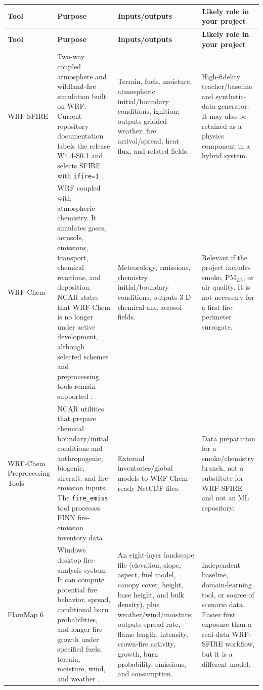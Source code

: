 \documentclass[11pt]{article}
\begin{document}
\begin{longtable}{p{}p{}p{}p{}}
\toprule
\textbf{Tool} & \textbf{Purpose} & \textbf{Inputs/outputs} & \textbf{Likely role in your project} \\
\midrule
\endfirsthead
\toprule
\textbf{Tool} & \textbf{Purpose} & \textbf{Inputs/outputs} & \textbf{Likely role in your project} \\
\midrule
\endhead
WRF-SFIRE & Two-way coupled atmosphere and wildland-fire simulation built on WRF. Current repository documentation labels the release W4.4-S0.1 and selects SFIRE with \texttt{ifire=1} \cite{wrfsfireRepo}. & Terrain, fuels, moisture, atmospheric initial/boundary conditions, ignition; outputs gridded weather, fire arrival/spread, heat flux, and related fields. & High-fidelity teacher/baseline and synthetic-data generator. It may also be retained as a physics component in a hybrid system. \\
\addlinespace
WRF-Chem & WRF coupled with atmospheric chemistry. It simulates gases, aerosols, emissions, transport, chemical reactions, and deposition. NCAR states that WRF-Chem is no longer under active development, although selected schemes and preprocessing tools remain supported \cite{wrfchem}. & Meteorology, emissions, chemistry initial/boundary conditions; outputs 3-D chemical and aerosol fields. & Relevant if the project includes smoke, PM$_{2.5}$, or air quality. It is not necessary for a first fire-perimeter surrogate. \\
\addlinespace
WRF-Chem Preprocessing Tools & NCAR utilities that prepare chemical boundary/initial conditions and anthropogenic, biogenic, aircraft, and fire-emission inputs. The \texttt{fire\_emiss} tool processes FINN fire-emission inventory data \cite{chemtools}. & External inventories/global models to WRF-Chem-ready NetCDF files. & Data preparation for a smoke/chemistry branch, not a substitute for WRF-SFIRE and not an ML repository. \\
\addlinespace
FlamMap 6 & Windows desktop fire-analysis system. It can compute potential fire behavior, spread, conditional burn probabilities, and longer fire growth under specified fuels, terrain, moisture, wind, and weather \cite{flammap}. & An eight-layer landscape file (elevation, slope, aspect, fuel model, canopy cover, height, base height, and bulk density), plus weather/wind/moisture; outputs spread rate, flame length, intensity, crown-fire activity, growth, burn probability, emissions, and consumption. & Independent baseline, domain-learning tool, or source of scenario data. Easier first exposure than a real-data WRF-SFIRE workflow, but it is a different model. \\

\end{longtable}
\end{document}
